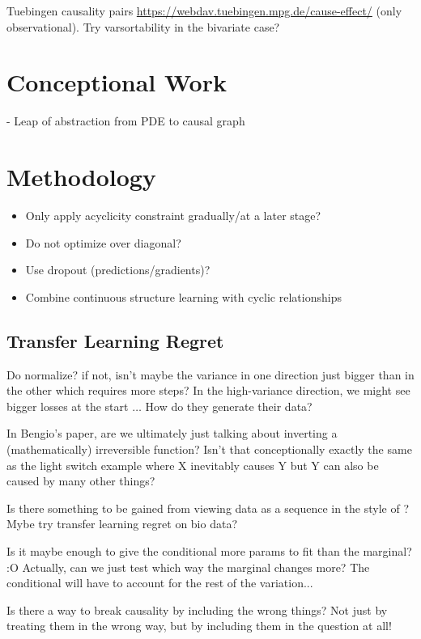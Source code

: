 \documentclass{article}
\begin{document}
Tuebingen causality pairs \url{https://webdav.tuebingen.mpg.de/cause-effect/} (only observational).
Try varsortability in the bivariate case?


\section{Conceptional Work}
    - Leap of abstraction from PDE to causal graph

\section{Methodology}
\begin{itemize}
    \item Only apply acyclicity constraint gradually/at a later stage?
    \item Do not optimize over diagonal?
    \item Use dropout (predictions/gradients)?
    \item Combine continuous structure learning with cyclic relationships
\end{itemize}

\subsection{Transfer Learning Regret}
Do \cite{bengio2019meta} normalize? if not, isn't maybe the variance in one direction just bigger than in the other which requires more steps? In the high-variance direction, we might see bigger losses at the start $\dots$
How do they generate their data?

In Bengio's paper, are we ultimately just talking about inverting a (mathematically) irreversible function?
Isn't that conceptionally exactly the same as the light switch example where X inevitably causes Y but Y can also be caused by many other things?

Is there something to be gained from viewing data as a sequence in the style of \cite{bengio2019meta}? Mybe try transfer learning regret on bio data?

Is it maybe enough to give the conditional more params to fit than the marginal? :O
Actually, can we just test which way the marginal changes more? The conditional will have to account for the rest of the variation...

Is there a way to break causality by including the wrong things? Not just by treating them in the wrong way, but by including them in the question at all!
\end{document}
